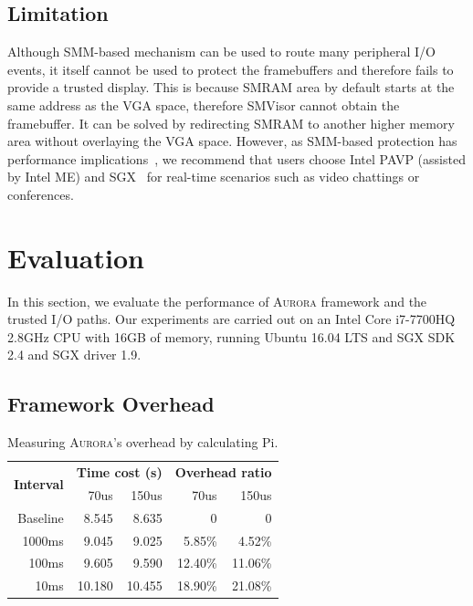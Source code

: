 \documentclass[journal,twocolumn,letterpaper,10pt]{IEEEtran}
\begin{document}
\subsection{Limitation}
Although SMM-based mechanism can be used to route many peripheral I/O events, it itself cannot be used to protect the framebuffers and therefore fails to provide a trusted display. This is because SMRAM area by default starts at the same address as the VGA space, therefore SMVisor cannot obtain the framebuffer. It can be solved by redirecting  SMRAM to another higher memory area without overlaying the VGA space. However, as SMM-based protection has performance implications~\cite{DBLP:conf/iiswc/DelgadoK13}, we recommend that users choose Intel PAVP (assisted by Intel ME) and SGX~\cite{DBLP:conf/isca/HoekstraLPPC13} for real-time scenarios such as video chattings or conferences.


\section{Evaluation}\label{performance}

In this section, we evaluate the performance of \textsc{Aurora} framework and the trusted I/O paths. Our experiments are carried out on  an Intel Core i7-7700HQ 2.8GHz CPU with 16GB of memory, running Ubuntu 16.04 LTS and SGX SDK 2.4 and SGX driver 1.9.

\subsection{Framework Overhead}

\begin{table}[t]
	\centering
	\caption{Measuring \textsc{Aurora}'s overhead by calculating Pi.}
	\label{table:pi}
	\begin{tabular}{rrrrr}
		\toprule
		\multirow{2}{*}{\textbf{Interval}} & \multicolumn{2}{c}{\textbf{Time cost (s)}} & \multicolumn{2}{c}{\textbf{Overhead ratio}} \\\cmidrule{2-3}	 \cmidrule{4-5}
		& 70us & 150us & 70us & 150us \\
		\midrule
		Baseline & 8.545 & 8.635 & 0 & 0\\
		1000ms & 9.045 & 9.025 & 5.85\% & 4.52\%\\
		100ms & 9.605 & 9.590 & 12.40\% & 11.06\%\\
		10ms & 10.180 & 10.455 & 18.90\% & 21.08\%\\
		\bottomrule
	\end{tabular}
\end{table}
\end{document}
